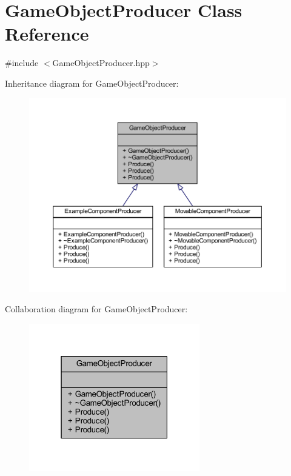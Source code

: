 \hypertarget{class_game_object_producer}{\section{Game\-Object\-Producer Class Reference}
\label{class_game_object_producer}
}


{\ttfamily \#include $<$Game\-Object\-Producer.\-hpp$>$}



Inheritance diagram for Game\-Object\-Producer\-:\nopagebreak
\begin{figure}[H]
\begin{center}
\leavevmode
\includegraphics[width=350pt]{class_game_object_producer__inherit__graph}
\end{center}
\end{figure}


Collaboration diagram for Game\-Object\-Producer\-:\nopagebreak
\begin{figure}[H]
\begin{center}
\leavevmode
\includegraphics[width=211pt]{class_game_object_producer__coll__graph}
\end{center}
\end{figure}
